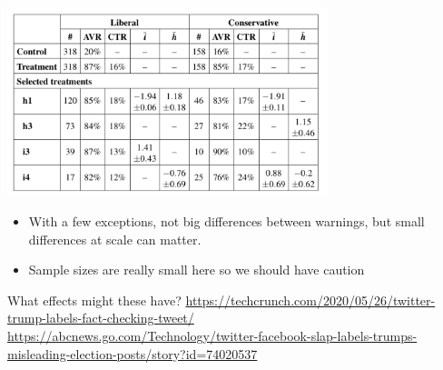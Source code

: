 \documentclass[aspectratio=169]{beamer}
\begin{document}
\begin{frame}

\begin{center}
\includegraphics[width=0.7\textwidth]{figures/kaiser_adapting_2020_tab4}
\end{center}

\begin{itemize}
\item With a few exceptions, not big differences between warnings, but small differences at scale can matter. \pause
\item Sample sizes are really small here so we should have caution
\end{itemize}

\end{frame}
\begin{frame}

\setcounter{subfigure}{0}
\begin{figure}
  \centering
  \hspace{0in}
\end{figure}

What effects might these have?
\vfill
{\tiny \url{https://techcrunch.com/2020/05/26/twitter-trump-labels-fact-checking-tweet/}\\
\url{https://abcnews.go.com/Technology/twitter-facebook-slap-labels-trumps-misleading-election-posts/story?id=74020537}}

\end{frame}
\end{document}
